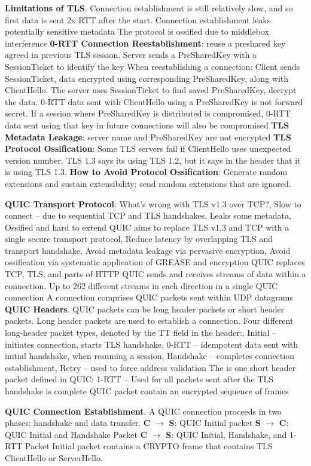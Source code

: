 \documentclass{article}
\begin{document}
\noindent \textbf{Limitations of TLS}.
Connection establishment is still relatively slow, and so first data is sent 2x RTT after the start.
Connection establishment leaks potentially sensitive metadata
The protocol is ossified due to middlebox interference
\textbf{0-RTT Connection Reestablishment}: reuse a preshared key agreed in previous TLS session.
Server sends a PreSharedKey with a SessionTicket to identify the key
When reestablishing a connection: Client sends SessionTicket, data encrypted using corresponding
PreSharedKey, along with ClientHello. The server uses SessionTicket to find saved PreSharedKey,
decrypt the data.
0-RTT data sent with ClientHello using a PreSharedKey is not forward secret.
If a session where PreSharedKey is distributed is compromised,
0-RTT data sent using that key in future connections will also be compromised
\textbf{TLS Metadata Leakage}: server name and PreSharedKey are not encrypted
\textbf{TLS Protocol Ossification}: Some TLS servers fail if ClientHello uses unexpected version number.
TLS 1.3 says its using TLS 1.2, but it says in the header that it is using TLS 1.3.
\textbf{How to Avoid Protocol Ossification}:
Generate random extensions and sustain extensibility: send random extensions that are ignored.

\noindent \textbf{QUIC Transport Protocol}:
What’s wrong with TLS v1.3 over TCP?,
Slow to connect – due to sequential TCP and TLS handshakes,
Leaks some metadata,
Ossified and hard to extend
QUIC aims to replace TLS v1.3 and TCP with a single secure transport protocol,
Reduce latency by overlapping TLS and transport handshake,
Avoid metadata leakage via pervasive encryption,
Avoid ossification via systematic application of GREASE and encryption
QUIC replaces TCP, TLS, and parts of HTTP
QUIC sends and receives streams of data within a connection.
Up to 262 different streams in each direction in a single QUIC connection
A connection comprises QUIC packets sent within UDP datagrams
\textbf{QUIC Headers}. QUIC packets can be long header packets or short header packets.
Long header packets are used to establish a connection.
Four different long-header packet types, denoted
by the TT field in the header:,
Initial – initiates connection, starts TLS handshake,
0-RTT – idempotent data sent with initial handshake, when resuming a session,
Handshake – completes connection establishment,
Retry – used to force address validation
The is one short header packet defined in QUIC:
1-RTT – Used for all packets sent after the TLS handshake is complete
QUIC packet contain an encrypted sequence of frames

\noindent \textbf{QUIC Connection Establishment}. A QUIC connection proceeds in two phases: handshake and data transfer.
\textbf{C} $\rightarrow$ \textbf{S}: QUIC Initial packet
\textbf{S} $\rightarrow$ \textbf{C}: QUIC Initial and Handshake Packet
\textbf{C} $\rightarrow$ \textbf{S}: QUIC Initial, Handshake, and 1-RTT Packet
Initial packet contains a CRYPTO frame that contains TLS ClientHello or ServerHello.
\end{document}
